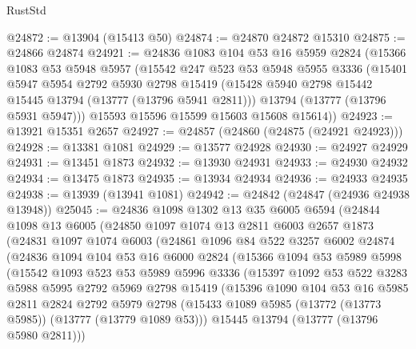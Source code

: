 \begin{lexlean}{RustStd}
\begin{coremodule}
@24872 := @13904 (@15413 @50)
@24874 := @24870 @24872 @15310
@24875 := @24866 @24874
@24921 := @24836
    @1083
    @104
    @53
    @16
    @5959
    @2824
    (@15366
      @1083
      @53
      @5948
      @5957
      (@15542
        @247
        @523
        @53
        @5948
        @5955
        @3336
        (@15401
          @5947
          @5954
          @2792
          @5930
          @2798
          @15419
          (@15428 @5940 @2798 @15442 @15445 @13794 (@13777 (@13796 @5941 @2811)))
          @13794
          (@13777 (@13796 @5931 @5947)))
        @15593
        @15596
        @15599
        @15603
        @15608
        @15614))
@24923 := @13921 @15351 @2657
@24927 := @24857 (@24860 (@24875 (@24921 @24923)))
@24928 := @13381 @1081
@24929 := @13577 @24928
@24930 := @24927 @24929
@24931 := @13451 @1873
@24932 := @13930 @24931
@24933 := @24930 @24932
@24934 := @13475 @1873
@24935 := @13934 @24934
@24936 := @24933 @24935
@24938 := @13939 (@13941 @1081)
@24942 := @24842 (@24847 (@24936 @24938 @13948))
@25045 := @24836
    @1098
    @1302
    @13
    @35
    @6005
    @6594
    (@24844
      @1098
      @13
      @6005
      (@24850
        @1097
        @1074
        @13
        @2811
        @6003
        @2657
        @1873
        (@24831
          @1097
          @1074
          @6003
          (@24861
            @1096
            @84
            @522
            @3257
            @6002
            @24874
            (@24836
              @1094
              @104
              @53
              @16
              @6000
              @2824
              (@15366
                @1094
                @53
                @5989
                @5998
                (@15542
                  @1093
                  @523
                  @53
                  @5989
                  @5996
                  @3336
                  (@15397
                    @1092
                    @53
                    @522
                    @3283
                    @5988
                    @5995
                    @2792
                    @5969
                    @2798
                    @15419
                    (@15396
                      @1090
                      @104
                      @53
                      @16
                      @5985
                      @2811
                      @2824
                      @2792
                      @5979
                      @2798
                      (@15433 @1089 @5985 (@13772 (@13773 @5985)) (@13777 (@13779 @1089 @53)))
                      @15445
                      @13794
                      (@13777 (@13796 @5980 @2811)))

\end{coremodule}
\end{lexlean}
